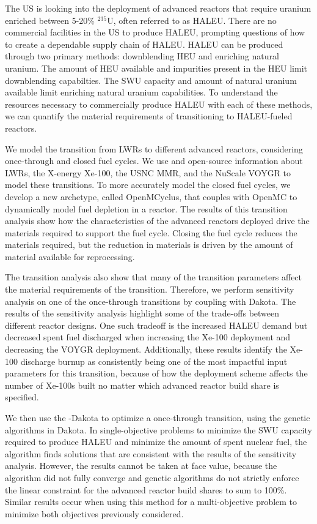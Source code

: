 The US is looking into the deployment of advanced reactors that 
require uranium enriched between 5-20\% $^{235}$U, often referred to 
as \gls{HALEU}. There are no commercial facilities 
in the US to produce \gls{HALEU}, 
prompting questions of how to create a dependable supply chain of \gls{HALEU}. 
\gls{HALEU} can be produced through two primary methods: downblending 
\gls{HEU} and enriching natural uranium. The amount of \gls{HEU} available 
and impurities present in the \gls{HEU} limit downblending capabilties.
The \gls{SWU} capacity and amount of natural uranium available limit 
enriching natural uranium capabilities. To understand the resources necessary 
to commercially produce \gls{HALEU} with each of these methods, we can 
quantify the material requirements of transitioning to \gls{HALEU}-fueled 
reactors. 

We model the transition from \glspl{LWR} to different 
advanced reactors, considering once-through and closed 
fuel cycles. We use \Cyclus and open-source 
information about \glspl{LWR}, the X-energy Xe-100, the
\gls{USNC} \gls{MMR}, and the NuScale VOYGR to model these 
transitions. To more accurately model the closed fuel 
cycles, we develop a new \Cyclus archetype, called OpenMCyclus, 
that couples with OpenMC to dynamically model fuel depletion in a 
reactor.  
The results of this transition analysis show how the 
characteristics of the advanced reactors deployed drive 
the materials required to support the fuel cycle. Closing the 
fuel cycle reduces the materials required, but the 
reduction in materials is driven by the amount of material 
available for reprocessing. 

The transition analysis also show that many of the transition 
parameters affect  the material requirements 
of the transition. Therefore, we perform sensitivity 
analysis on one of the once-through transitions by coupling 
\Cyclus with Dakota. The results of 
the sensitivity analysis highlight some of the trade-offs between 
different reactor designs. One such tradeoff is the increased 
\gls{HALEU} demand but decreased spent fuel discharged when increasing 
the Xe-100 deployment and decreasing the VOYGR  deployment. Additionally, 
these results identify the Xe-100 discharge burnup as consistently 
being one of the most impactful input parameters for this transition, 
because of how the deployment scheme affects the number of 
Xe-100s built no matter which advanced reactor build share is 
specified. 

We then use the \Cyclus-Dakota to optimize a once-through transition, 
using the genetic algorithms in Dakota. In single-objective problems to 
minimize the \gls{SWU} capacity required to produce \gls{HALEU} and 
minimize the amount of spent nuclear fuel, the algorithm finds 
solutions that are consistent with the results of the 
sensitivity analysis. However, the results cannot be taken at face 
value, because the algorithm did not fully converge and genetic 
algorithms do not strictly enforce the 
linear constraint for the advanced reactor build shares to sum to 
100\%. Similar results occur when using 
this method for a multi-objective problem to minimize both objectives 
previously considered. 

